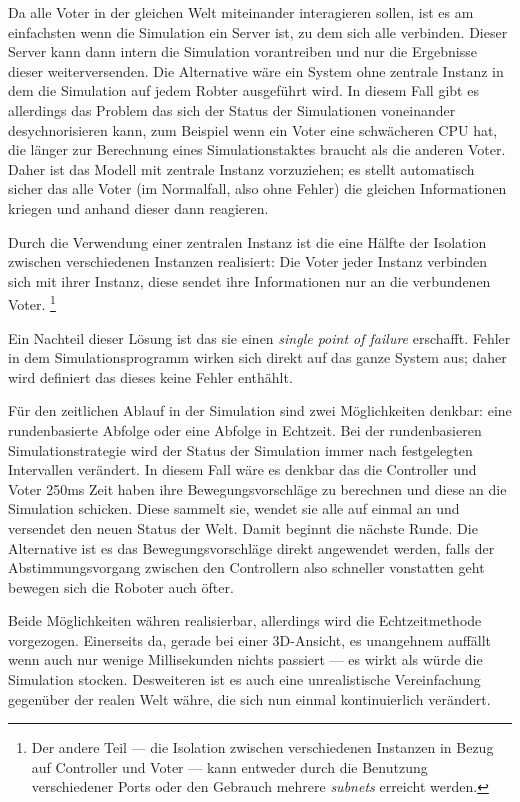 Da alle Voter in der gleichen Welt miteinander interagieren sollen, ist es am einfachsten wenn die Simulation ein Server ist, zu dem sich alle
verbinden. Dieser Server kann dann intern die Simulation vorantreiben und nur die Ergebnisse dieser weiterversenden. Die Alternative
w{\"{a}}re ein System ohne zentrale Instanz in dem die Simulation auf jedem Robter ausgef{\"{u}}hrt wird. In diesem Fall gibt es
allerdings das Problem das sich der Status der Simulationen voneinander desychnorisieren kann, zum Beispiel wenn ein Voter
eine schw{\"{a}}cheren CPU hat, die l{\"{a}}nger zur Berechnung eines Simulationstaktes braucht als die anderen Voter. Daher ist
das Modell mit zentrale Instanz vorzuziehen; es stellt automatisch sicher das alle Voter (im Normalfall, also ohne Fehler)
die gleichen Informationen kriegen und anhand dieser dann reagieren.

Durch die Verwendung einer zentralen Instanz ist die eine H{\"{a}}lfte der Isolation zwischen verschiedenen Instanzen realisiert:
Die Voter jeder Instanz verbinden sich mit ihrer Instanz, diese sendet ihre Informationen nur an die verbundenen Voter.
\footnote{Der andere Teil --- die Isolation zwischen verschiedenen Instanzen in Bezug auf Controller und Voter --- kann entweder
durch die Benutzung verschiedener Ports oder den Gebrauch mehrere \textit{subnets} erreicht werden.}

Ein Nachteil dieser L{\"{o}}sung ist das sie einen \textit{single point of failure} erschafft. Fehler in dem Simulationsprogramm
wirken sich direkt auf das ganze System aus; daher wird definiert das dieses keine Fehler enth{\"{a}}hlt.

F{\"{u}}r den zeitlichen Ablauf in der Simulation sind zwei M{\"{o}}glichkeiten denkbar: eine rundenbasierte Abfolge oder eine
Abfolge in Echtzeit. Bei der rundenbasieren Simulationstrategie wird der Status der Simulation immer nach festgelegten Intervallen
ver{\"{a}}ndert. In diesem Fall w{\"{a}}re es denkbar das die Controller und Voter 250ms Zeit haben ihre Bewegungsvorschl{\"{a}}ge
zu berechnen und diese an die Simulation schicken. Diese sammelt sie, wendet sie alle auf einmal an und versendet den neuen Status der
Welt. Damit beginnt die n{\"{a}}chste Runde. Die Alternative ist es das Bewegungsvorschl{\"{a}}ge direkt angewendet werden, falls
der Abstimmungsvorgang zwischen den Controllern also schneller vonstatten geht bewegen sich die Roboter auch {\"{o}}fter.

Beide M{\"{o}}glichkeiten w{\"{a}}hren realisierbar, allerdings wird die Echtzeitmethode vorgezogen. Einerseits da, gerade bei einer
3D-Ansicht, es unangehnem auff{\"{a}}llt wenn auch nur wenige Millisekunden nichts passiert --- es wirkt als w{\"{u}}rde die
Simulation stocken. Desweiteren ist es auch eine unrealistische Vereinfachung gegen{\"{u}}ber der realen Welt w{\"{a}}hre,
die sich nun einmal kontinuierlich ver{\"{a}}ndert.

